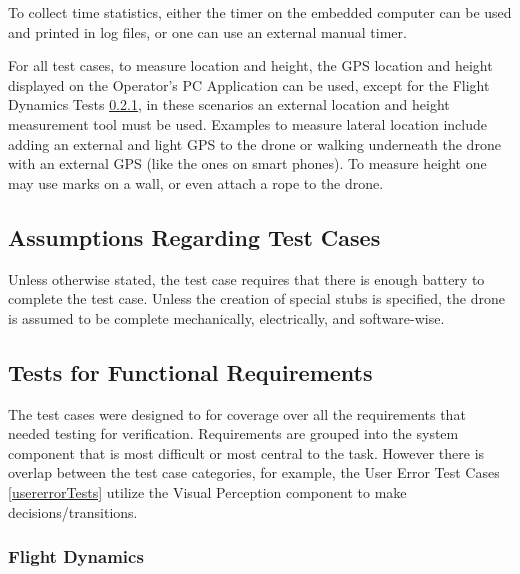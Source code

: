 \documentclass[12pt, titlepage]{article}
\begin{document}
To collect time statistics, either the timer on the embedded computer can be used and printed in log files, or one can use an external manual timer.

For all test cases, to measure location and height, the GPS location and height displayed on the Operator's PC Application can be used, except for the Flight Dynamics Tests \ref{flightdynamicsTests}, in these scenarios an external location and height measurement tool must be used. Examples to measure lateral location include adding an external and light GPS to the drone or walking underneath the drone with an external GPS (like the ones on smart phones). To measure height one may use marks on a wall, or even attach a rope to the drone.

\subsection{Assumptions Regarding Test Cases}
Unless otherwise stated, the test case requires that there is enough battery to complete the test case.
Unless the creation of special stubs is specified, the drone is assumed to be complete mechanically, electrically, and software-wise. 

\subsection{Tests for Functional Requirements}

The test cases were designed to for coverage over all the requirements that needed testing for verification. Requirements are grouped into the system component that is most difficult or most central to the task. However there is overlap between the test case categories, for example, the User Error Test Cases \ref{usererrorTests} utilize the Visual Perception component to make decisions/transitions.

\subsubsection{Flight Dynamics}
\label{flightdynamicsTests}
\end{document}
